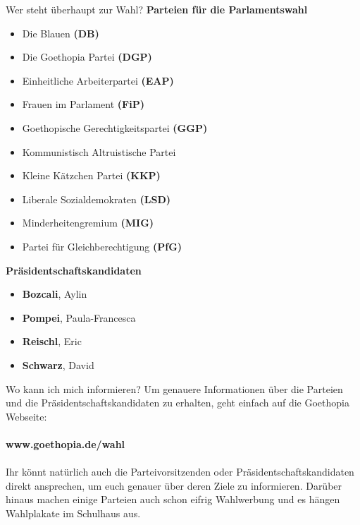 \documentclass{sasbase}
\begin{document}
\begin{question}{Wer steht überhaupt zur Wahl?}
    \textbf{Parteien für die Parlamentswahl}
    \begin{itemize}
        \item Die Blauen \textbf{(DB)}
        \item Die Goethopia Partei \textbf{(DGP)}
        \item Einheitliche Arbeiterpartei \textbf{(EAP)}
        \item Frauen im Parlament \textbf{(FiP)}
        \item Goethopische Gerechtigkeitspartei \textbf{(GGP)}
        \item Kommunistisch Altruistische Partei 
        \item Kleine Kätzchen Partei \textbf{(KKP)}
        \item Liberale Sozialdemokraten \textbf{(LSD)}
        \item Minderheitengremium \textbf{(MIG)}
        \item Partei für Gleichberechtigung \textbf{(PfG)}
    \end{itemize}
    
    \textbf{Präsidentschaftskandidaten}
    \begin{itemize}
        \item \textbf{Bozcali}, Aylin
        \item \textbf{Pompei}, Paula-Francesca 
        \item \textbf{Reischl}, Eric 
        \item \textbf{Schwarz}, David 
    \end{itemize}
\end{question}

\begin{question}{Wo kann ich mich informieren?}
    Um genauere Informationen über die Parteien und die Präsidentschaftskandidaten zu erhalten,
    geht einfach auf die Goethopia Webseite:
    \\\\
    \noindent\textbf{www.goethopia.de/wahl}
    \\\\
    Ihr könnt natürlich auch die Parteivorsitzenden oder Präsidentschaftskandidaten direkt
    ansprechen, um euch genauer über deren Ziele zu informieren. Darüber hinaus machen einige Parteien auch schon
    eifrig Wahlwerbung und es hängen Wahlplakate im Schulhaus aus. 
\end{question}
\end{document}
